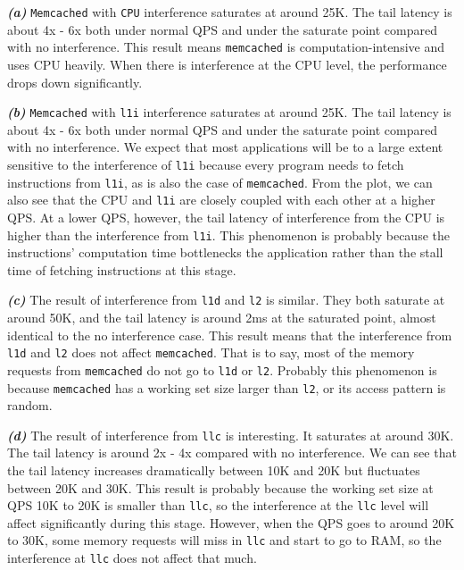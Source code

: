 

\emph{\textbf{(a)}} \texttt{Memcached} with \texttt{CPU} interference saturates at around 25K.
The tail latency is about 4x - 6x both under normal QPS and under the saturate point compared with no interference.
This result means \texttt{memcached} is computation-intensive and uses CPU heavily. When there is interference at the CPU level,
the performance drops down significantly.


\emph{\textbf{(b)}}
\texttt{Memcached} with \texttt{l1i} interference saturates at around 25K.
The tail latency is about 4x - 6x both under normal QPS and under the saturate point compared with no interference.
We expect that most applications will be to a large extent sensitive to the interference of \texttt{l1i} because every program needs to fetch instructions from \texttt{l1i}, as is also the case of \texttt{memcached}.  
From the plot, we can also see that the CPU and \texttt{l1i} are closely coupled with each other at a higher QPS. At a lower QPS, however, 
the tail latency of interference from the  CPU is  higher than the interference from \texttt{l1i}. This phenomenon is probably because the
 instructions' computation time bottlenecks the application rather than the stall time of fetching instructions at this stage.


\emph{\textbf{(c)}}
The result of interference from \texttt{l1d} and \texttt{l2} is similar. They both saturate at around 50K, and the tail latency is around 2ms at the saturated point, almost identical to the no interference case.
This result means that the interference from \texttt{l1d} and \texttt{l2} does not affect \texttt{memcached}. That is to say, most of the memory requests from \texttt{memcached} do not go to \texttt{l1d} or \texttt{l2}.
Probably this phenomenon is  because \texttt{memcached} has a working set size larger than \texttt{l2}, or its access pattern is random.


\emph{\textbf{(d)}}
The result of interference from \texttt{llc} is interesting. It saturates at around 30K. The tail latency is around 2x - 4x compared with no interference.
We can see that the tail latency increases dramatically between 10K and 20K but fluctuates between 20K and 30K. This result is probably
because the working set size at QPS 10K to 20K is smaller than \texttt{llc}, so the interference at the \texttt{llc} level will affect significantly during this stage.
However, when the QPS goes to around 20K to 30K, some memory requests will miss in \texttt{llc} and start to go to RAM, so the interference at \texttt{llc} does not affect that much.


